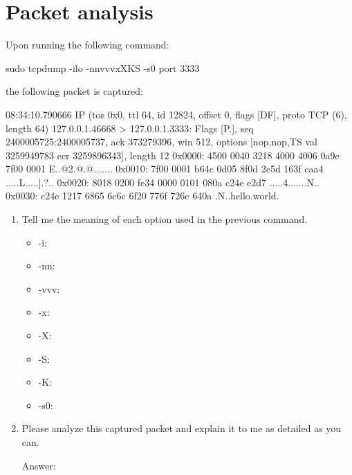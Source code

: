 \documentclass{swfulabreport}
\begin{document}
\maketitle %
\clearpage
\section{Packet analysis}

Upon running the following command:

\begin{shcode}
sudo tcpdump -ilo -nnvvvxXKS -s0 port 3333
\end{shcode}

the following packet is captured:

\begin{outputcode}
08:34:10.790666 IP (tos 0x0, ttl 64, id 12824, offset 0, flags [DF],
proto TCP (6), length 64)
  127.0.0.1.46668 > 127.0.0.1.3333: Flags [P.], seq 2400005725:2400005737,
ack 373279396,
  win 512, options [nop,nop,TS val 3259949783 ecr 3259896343], length 12
      0x0000:  4500 0040 3218 4000 4006 0a9e 7f00 0001  E..@2.@.@.......
      0x0010:  7f00 0001 b64c 0d05 8f0d 2e5d 163f caa4  .....L.....].?..
      0x0020:  8018 0200 fe34 0000 0101 080a c24e e2d7  .....4.......N..
      0x0030:  c24e 1217 6865 6c6c 6f20 776f 726c 640a  .N..hello.world.
\end{outputcode}

\begin{enumerate}
\item Tell me the meaning of each option used in the previous command.
  \begin{itemize}
  \item -i:
  \item -nn:
  \item -vvv:
  \item -x:
  \item -X:
  \item -S:
  \item -K:
  \item -s0:
  \end{itemize}

\item Please analyze this captured packet and explain it to me as
  detailed as you can.
  \begin{description}
  \item[Answer:]
  \end{description}
\end{enumerate}
\end{document}
